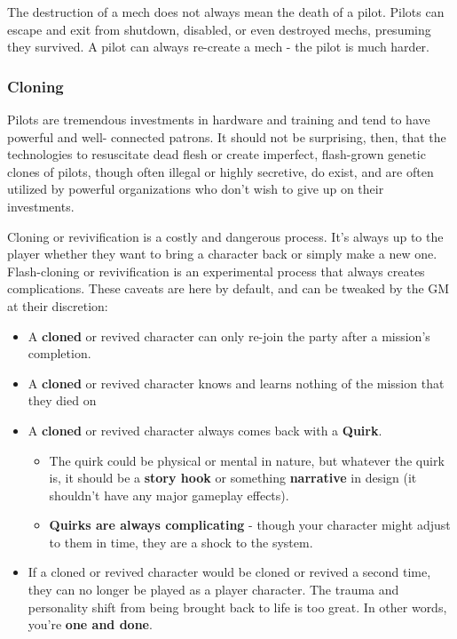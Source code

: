 The destruction of a mech does not always mean the death of a pilot. Pilots can escape and exit from shutdown, disabled, or even destroyed mechs, presuming they survived. A pilot can always re-create a mech - the pilot is much harder.

\subsubsection{Cloning}

Pilots are tremendous investments in hardware and training and tend to have powerful and well- connected patrons. It should not be surprising, then, that the technologies to resuscitate dead flesh or create imperfect, flash-grown genetic clones of pilots, though often illegal or highly secretive, do exist, and are often utilized by powerful organizations who don’t wish to give up on their investments. 

Cloning or revivification is a costly and dangerous process. It’s always up to the player whether they want to bring a character back or simply make a new one. Flash-cloning or revivification is an experimental process that always creates complications. These caveats are here by default, and can be tweaked by the GM at their discretion: 
\begin{itemize}
\item A \textbf{cloned} or revived character can only re-join the party after a mission’s completion. 
\item A \textbf{cloned} or revived character knows and learns nothing of the mission that they died on 
\item A \textbf{cloned} or revived character always comes back with a \textbf{Quirk}. 
\begin{itemize}
\item The quirk could be physical or mental in nature, but whatever the quirk is, it should be a \textbf{story hook} or something \textbf{narrative} in design (it shouldn’t have any major gameplay effects). 
\item \textbf{Quirks are always complicating} - though your character might adjust to them in time, they are a shock to the system.
\end{itemize}
\item If a cloned or revived character would be cloned or revived a second time, they can no longer be played as a player character. The trauma and personality shift from being brought back to life is too great. In other words, you’re \textbf{one and done}.
\end{itemize}

